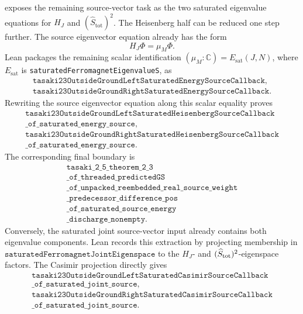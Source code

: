 \documentclass[a4paper,11pt]{article}
\begin{document}
exposes the remaining source-vector task as the two saturated eigenvalue
equations for \(H_J\) and \((\hat S_{\mathrm{tot}})^2\).
The Heisenberg half can be reduced one step further.  The source
eigenvector equation already has the form
\[
  H_J\Phi = \mu_M\Phi.
\]
Lean packages the remaining scalar identification
\((\mu_M:\mathbb C)=E_{\mathrm{sat}}(J,N)\), where
\(E_{\mathrm{sat}}\) is
\texttt{saturatedFerromagnetEigenvalueS}, as
\[
\begin{gathered}
\texttt{tasaki23OutsideGroundLeftSaturatedEnergySourceCallback},\\
\texttt{tasaki23OutsideGroundRightSaturatedEnergySourceCallback}.
\end{gathered}
\]
Rewriting the source eigenvector equation along this scalar equality proves
\[
\begin{gathered}
\texttt{tasaki23OutsideGroundLeftSaturatedHeisenbergSourceCallback}\\
\texttt{\_of\_saturated\_energy\_source},\\
\texttt{tasaki23OutsideGroundRightSaturatedHeisenbergSourceCallback}\\
\texttt{\_of\_saturated\_energy\_source}.
\end{gathered}
\]
The corresponding final boundary is
\[
\begin{gathered}
\texttt{tasaki\_2\_5\_theorem\_2\_3}\\
\texttt{\_of\_threaded\_predictedGS}\\
\texttt{\_of\_unpacked\_reembedded\_real\_source\_weight}\\
\texttt{\_predecessor\_difference\_pos}\\
\texttt{\_of\_saturated\_source\_energy}\\
\texttt{\_discharge\_nonempty}.
\end{gathered}
\]
Conversely, the saturated joint source-vector input already contains both
eigenvalue components.  Lean records this extraction by projecting
membership in
\(\texttt{saturatedFerromagnetJointEigenspace}\) to the
\(H_J\)- and \((\widehat S_{\rm tot})^2\)-eigenspace factors.  The
Casimir projection directly gives
\[
\begin{gathered}
\texttt{tasaki23OutsideGroundLeftSaturatedCasimirSourceCallback}\\
\texttt{\_of\_saturated\_joint\_source},\\
\texttt{tasaki23OutsideGroundRightSaturatedCasimirSourceCallback}\\
\texttt{\_of\_saturated\_joint\_source}.
\end{gathered}
\]
\end{document}
